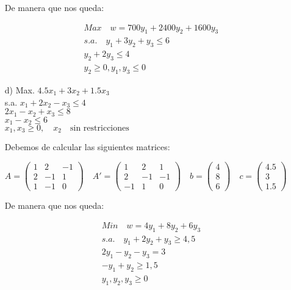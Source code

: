 \begin{itemize}
    De manera que nos queda:

    \begin{align*}
        Max \quad w = 700y_1 + 2400y_2 + 1600y_3 \\
        s.a. \quad y_1 + 3y_2 + y_3 \leq 6 \\
        y_2 + 2y_3 \leq 4 \\
        y_2 \geq 0, y_1, y_3 \leq 0  
    \end{align*}
    
    \item[d)] Max. \quad $4.5x_1 + 3x_2 + 1.5x_3$ \\
    s.a. \quad $x_1 + 2x_2 - x_3 \leq 4$ \\
    \quad \quad $2x_1 - x_2 + x_3 \leq 8$ \\
    \quad \quad $x_1 - x_2 \leq 6$ \\
    \quad \quad $x_1, x_3 \geq 0, \quad x_2 \quad \text{sin restricciones}$

    Debemos de calcular las siguientes matrices:

    $ A =
    \begin{pmatrix}
        1 & 2 & -1 \\
        2 & -1 & 1 \\
        1 & -1 & 0
    \end{pmatrix} \quad
    A' = \begin{pmatrix}
        1 & 2 & 1 \\
        2 & -1 & -1 \\
        -1 & 1 & 0
    \end{pmatrix}
    \quad b = \begin{pmatrix}
        4 \\
        8 \\
        6
    \end{pmatrix} \quad c = \begin{pmatrix}
        4.5 \\
        3 \\
        1.5
    \end{pmatrix}
    $

    De manera que nos queda:    

    \begin{align*}
        Min \quad w = 4y_1 + 8y_2 + 6y_3 \\
        s.a. \quad y_1 + 2y_2 + y_3 \geq 4,5 \\
        2y_1 - y_2 - y_3 = 3 \\
        - y_1 + y_2 \geq 1,5 \\
        y_1, y_2, y_3 \geq 0 
    \end{align*}
    

\end{itemize}

